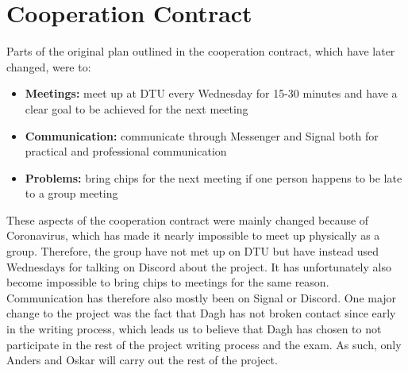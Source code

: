 \documentclass[11pt, fleqn]{article}
\begin{document}
	\section*{Cooperation Contract}
	Parts of the original plan outlined in the cooperation contract, which have later changed, were to:
	\begin{itemize}
		\item \textbf{Meetings:} meet up at DTU every Wednesday for 15-30 minutes and have a clear goal to be achieved for the next meeting
		\item \textbf{Communication:} communicate through Messenger and Signal both for practical and professional communication
		\item \textbf{Problems:} bring chips for the next meeting if one person happens to be late to a group meeting
	\end{itemize}
	
	These aspects of the cooperation contract were mainly changed because of Coronavirus, which has made it nearly impossible to meet up physically as a group. Therefore, the group have not met up on DTU but have instead used Wednesdays for talking on Discord about the project. It has unfortunately also become impossible to bring chips to meetings for the same reason. Communication has therefore also mostly been on Signal or Discord. One major change to the project was the fact that Dagh has not broken contact since early in the writing process, which leads us to believe that Dagh has chosen to not participate in the rest of the project writing process and the exam. As such, only Anders and Oskar will carry out the rest of the project.
	
\end{document}
